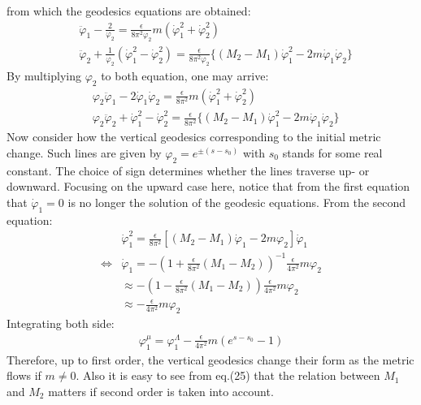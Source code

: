 \documentclass[fleqn]{article}
\begin{document}
from which the geodesics equations are obtained:
\begin{align}[left=\empheqlbrace]
&\ddot \varphi _{1} - \frac{2} {\varphi _{2}} = \frac{\epsilon}{8\pi ^{2} \varphi_{2}}m (\dot \varphi _{1} ^{2} + \dot \varphi_{2} ^{2}) \\
&\ddot \varphi _{2} + \frac{1}{\varphi _{2}} (\dot \varphi _{1} ^{2} - \dot \varphi _{2} ^{2}) = \frac{\epsilon} {8\pi ^{2} \varphi _{2}} \lbrace (M_{2} - M_{1}) \dot \varphi _{1} ^{2} -2m\dot \varphi _{1} \dot \varphi _{2}\rbrace 
\end{align}
By multiplying $\varphi_{2}$ to both equation, one may arrive:
\begin{align}[left=\empheqlbrace]
& \varphi_{2} \ddot \varphi _{1} - 2\dot \varphi _{1} \dot \varphi_{2} = \frac{\epsilon } {8\pi ^{2} } m(\dot \varphi _{1} ^{2} + \dot \varphi _{2} ^{2} ) \\
& \varphi _{2} \ddot \varphi _{2} + \dot \varphi _{1} ^{2} - \dot \varphi _{2} ^{2} = \frac{\epsilon }{8\pi ^{2}} \lbrace (M_{2} - M_{1} ) \dot \varphi _{1} ^{2} - 2m \dot \varphi _{1} \dot \varphi _{2} \rbrace 
\end{align}
Now consider how the vertical geodesics corresponding to the initial metric change. Such lines are given by $\varphi _{2}= e^{\pm(s-s_{0})}$ with $s_{0}$ stands for some real constant. The choice of sign determines whether the lines traverse up- or downward. Focusing on the upward case here, notice that from the first equation that $\dot \varphi _{1} = 0$ is no longer the solution of the geodesic equations. From the second equation:
\begin{align}
&\dot \varphi _{1} ^{2} = \frac{\epsilon}{8\pi ^{2}}[(M_{2} - M_{1})\dot \varphi _{1} -2m \varphi _{2}] \dot \varphi _{1}  \nonumber \\
\Leftrightarrow & \dot \varphi_{1} = -(1+ \frac{\epsilon} {8\pi ^{2} }(M_{1} - M_{2}))^{-1} \frac{\epsilon} {4\pi ^{2}}m\varphi_{2} \nonumber \\
&\approx -(1- \frac{\epsilon}{8\pi ^{2}} (M_{1} -M_{2}))\frac{\epsilon}{4\pi ^{2}}m\varphi _{2} \nonumber \\
&\approx -\frac{\epsilon}{4\pi ^{2}}m \varphi _{2}
\end{align}
Integrating both side:
\begin{align}
\varphi _{1}^{\mu} = \varphi _{1} ^{\Lambda} - \frac{\epsilon}{4\pi ^{2}}m (e^{s-s_{0}} -1) 
\end{align}
Therefore, up to first order, the vertical geodesics change their form as the metric flows if $m \neq 0$. Also it is easy to see from eq.(25) that the relation between $M_{1}$ and $M_{2}$ matters if second order is taken into account. \\
\end{document}
